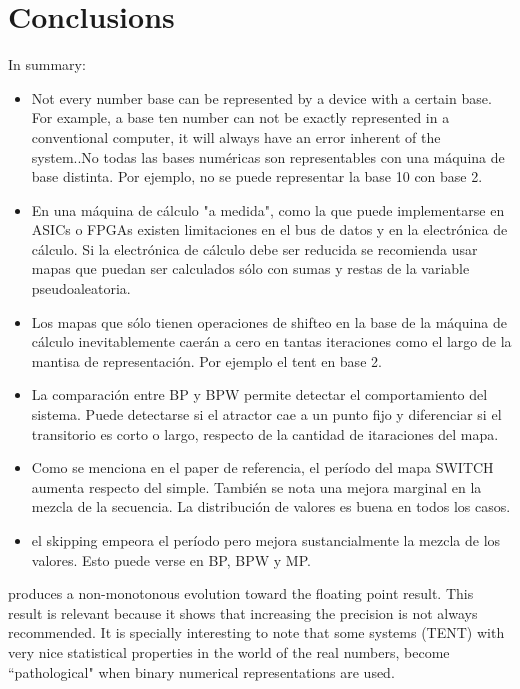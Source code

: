 \section{Conclusions}\label{sec:conclusions}
In summary:
\begin{itemize}
  \item Not every number base can be represented by a device with a certain base. For example, a base ten number can not be exactly represented in a conventional computer, it will always have an error inherent of the system..No todas las bases numéricas son representables con una máquina de base distinta. Por ejemplo, no se puede representar la base 10 con base 2.
  \item En una máquina de cálculo "a medida", como la que puede implementarse en ASICs o FPGAs existen limitaciones en el bus de datos y en la electrónica de cálculo. Si la electrónica de cálculo debe ser reducida se recomienda usar mapas que puedan ser calculados sólo con sumas y restas de la variable pseudoaleatoria.
  \item Los mapas que sólo tienen operaciones de shifteo en la base de la máquina de cálculo inevitablemente caerán a cero en tantas iteraciones como el largo de la mantisa de representación. Por ejemplo el tent en base 2.
  \item La comparación entre BP y BPW permite detectar el comportamiento del sistema. Puede detectarse si el atractor cae a un punto fijo y diferenciar si el transitorio es corto o largo, respecto de la cantidad de itaraciones del mapa.
  \item Como se menciona en el paper de referencia, el período del mapa SWITCH aumenta respecto del simple. También se nota una mejora marginal en la mezcla de la secuencia. La distribución de valores es buena en todos los casos.
  \item el skipping empeora el período pero mejora sustancialmente la mezcla de los valores. Esto puede verse en BP, BPW y MP.
\end{itemize}

produces a non-monotonous evolution toward the floating point result. This result is relevant because it shows that increasing the precision is not
always recommended.
It is specially interesting to note that some systems (TENT) with very nice statistical properties in the world of the real numbers, become ``pathological" when binary numerical representations are used.